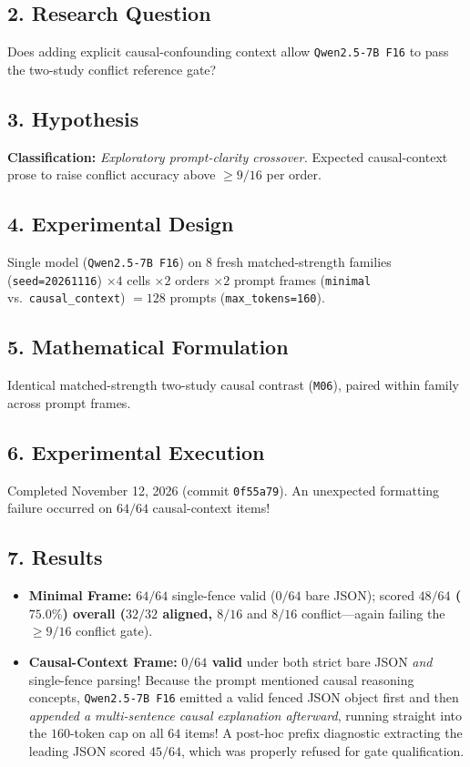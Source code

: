 \subsection*{2. Research Question}
Does adding explicit causal-confounding context allow \texttt{Qwen2.5-7B F16} to pass the two-study conflict reference gate?

\subsection*{3. Hypothesis}
\textbf{Classification:} \emph{Exploratory prompt-clarity crossover.} Expected causal-context prose to raise conflict accuracy above $\ge 9/16$ per order.

\subsection*{4. Experimental Design}
Single model (\texttt{Qwen2.5-7B F16}) on $8$ fresh matched-strength families (\texttt{seed=20261116}) $\times 4$ cells $\times 2$ orders $\times 2$ prompt frames (\texttt{minimal} vs.\ \texttt{causal\_context}) $= 128$ prompts (\texttt{max\_tokens=160}).

\subsection*{5. Mathematical Formulation}
Identical matched-strength two-study causal contrast (\texttt{M06}), paired within family across prompt frames.

\subsection*{6. Experimental Execution}
Completed November 12, 2026 (commit \texttt{0f55a79}). An unexpected formatting failure occurred on $64/64$ causal-context items!

\subsection*{7. Results}
\begin{itemize}
  \item \textbf{Minimal Frame:} $64/64$ single-fence valid ($0/64$ bare JSON); scored \textbf{$48/64$ ($75.0\%$)\textbf{ overall ($32/32$ aligned, }$8/16$} and \textbf{$8/16$} conflict---again failing the $\ge 9/16$ conflict gate).
  \item \textbf{Causal-Context Frame:} \textbf{$0/64$ valid} under both strict bare JSON \emph{and} single-fence parsing! Because the prompt mentioned causal reasoning concepts, \texttt{Qwen2.5-7B F16} emitted a valid fenced JSON object first and then \emph{appended a multi-sentence causal explanation afterward}, running straight into the $160$-token cap on all $64$ items! A post-hoc prefix diagnostic extracting the leading JSON scored $45/64$, which was properly refused for gate qualification.
\end{itemize}

